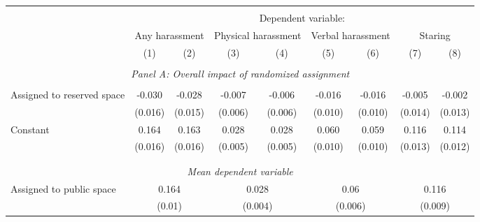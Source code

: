 \begin{tabular}{l*{8}{c}} \hline\hline \\[-1.8ex] & \multicolumn{8}{c}{Dependent variable: } \\ 
                    &\multicolumn{2}{c}{Any harassment}         &\multicolumn{2}{c}{Physical harassment}    &\multicolumn{2}{c}{Verbal harassment}      &\multicolumn{2}{c}{Staring}                \\\cmidrule(lr){2-3}\cmidrule(lr){4-5}\cmidrule(lr){6-7}\cmidrule(lr){8-9}
                    &\multicolumn{1}{c}{(1)}         &\multicolumn{1}{c}{(2)}         &\multicolumn{1}{c}{(3)}         &\multicolumn{1}{c}{(4)}         &\multicolumn{1}{c}{(5)}         &\multicolumn{1}{c}{(6)}         &\multicolumn{1}{c}{(7)}         &\multicolumn{1}{c}{(8)}         \\
 \hline \\[-1ex] \multicolumn{9}{c}{\textit{Panel A: Overall impact of randomized assignment}} \\\\[-1ex]
Assigned to reserved space&      -0.030\sym{*}  &      -0.028\sym{*}  &      -0.007         &      -0.006         &      -0.016         &      -0.016         &      -0.005         &      -0.002         \\
                    &     (0.016)         &     (0.015)         &     (0.006)         &     (0.006)         &     (0.010)         &     (0.010)         &     (0.014)         &     (0.013)         \\
[1em]
Constant            &       0.164\sym{***}&       0.163\sym{***}&       0.028\sym{***}&       0.028\sym{***}&       0.060\sym{***}&       0.059\sym{***}&       0.116\sym{***}&       0.114\sym{***}\\
                    &     (0.016)         &     (0.016)         &     (0.005)         &     (0.005)         &     (0.010)         &     (0.010)         &     (0.013)         &     (0.012)         \\
\\[-1.8ex] \hline \\[-1.8ex] \multicolumn{9}{c}{\textit{Mean dependent variable}} \\ Assigned to public space & \multicolumn{2}{c}{0.164} & \multicolumn{2}{c}{0.028} & \multicolumn{2}{c}{0.06} & \multicolumn{2}{c}{0.116} \\ \, & \multicolumn{2}{c}{(0.01)} & \multicolumn{2}{c}{(0.004)} & \multicolumn{2}{c}{(0.006)} & \multicolumn{2}{c}{(0.009)} \\ 


\end{tabular}
